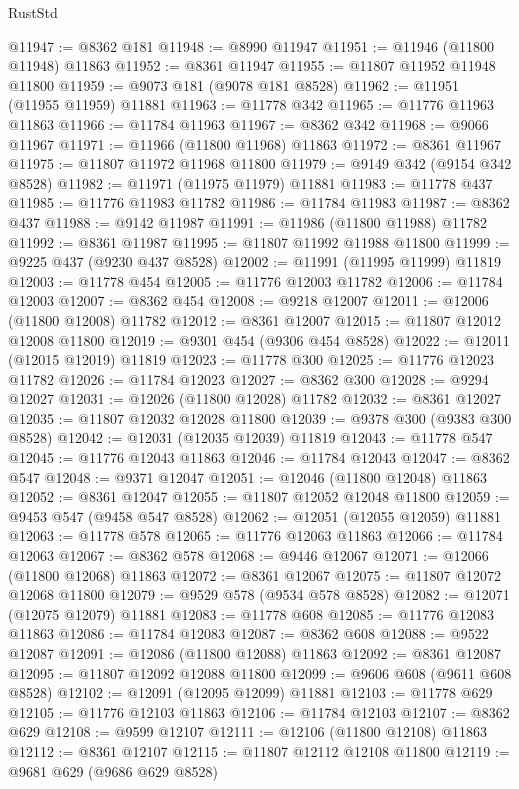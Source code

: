 \begin{lexlean}{RustStd}
\begin{coremodule}
@11947 := @8362 @181
@11948 := @8990 @11947
@11951 := @11946 (@11800 @11948) @11863
@11952 := @8361 @11947
@11955 := @11807 @11952 @11948 @11800
@11959 := @9073 @181 (@9078 @181 @8528)
@11962 := @11951 (@11955 @11959) @11881
@11963 := @11778 @342
@11965 := @11776 @11963 @11863
@11966 := @11784 @11963
@11967 := @8362 @342
@11968 := @9066 @11967
@11971 := @11966 (@11800 @11968) @11863
@11972 := @8361 @11967
@11975 := @11807 @11972 @11968 @11800
@11979 := @9149 @342 (@9154 @342 @8528)
@11982 := @11971 (@11975 @11979) @11881
@11983 := @11778 @437
@11985 := @11776 @11983 @11782
@11986 := @11784 @11983
@11987 := @8362 @437
@11988 := @9142 @11987
@11991 := @11986 (@11800 @11988) @11782
@11992 := @8361 @11987
@11995 := @11807 @11992 @11988 @11800
@11999 := @9225 @437 (@9230 @437 @8528)
@12002 := @11991 (@11995 @11999) @11819
@12003 := @11778 @454
@12005 := @11776 @12003 @11782
@12006 := @11784 @12003
@12007 := @8362 @454
@12008 := @9218 @12007
@12011 := @12006 (@11800 @12008) @11782
@12012 := @8361 @12007
@12015 := @11807 @12012 @12008 @11800
@12019 := @9301 @454 (@9306 @454 @8528)
@12022 := @12011 (@12015 @12019) @11819
@12023 := @11778 @300
@12025 := @11776 @12023 @11782
@12026 := @11784 @12023
@12027 := @8362 @300
@12028 := @9294 @12027
@12031 := @12026 (@11800 @12028) @11782
@12032 := @8361 @12027
@12035 := @11807 @12032 @12028 @11800
@12039 := @9378 @300 (@9383 @300 @8528)
@12042 := @12031 (@12035 @12039) @11819
@12043 := @11778 @547
@12045 := @11776 @12043 @11863
@12046 := @11784 @12043
@12047 := @8362 @547
@12048 := @9371 @12047
@12051 := @12046 (@11800 @12048) @11863
@12052 := @8361 @12047
@12055 := @11807 @12052 @12048 @11800
@12059 := @9453 @547 (@9458 @547 @8528)
@12062 := @12051 (@12055 @12059) @11881
@12063 := @11778 @578
@12065 := @11776 @12063 @11863
@12066 := @11784 @12063
@12067 := @8362 @578
@12068 := @9446 @12067
@12071 := @12066 (@11800 @12068) @11863
@12072 := @8361 @12067
@12075 := @11807 @12072 @12068 @11800
@12079 := @9529 @578 (@9534 @578 @8528)
@12082 := @12071 (@12075 @12079) @11881
@12083 := @11778 @608
@12085 := @11776 @12083 @11863
@12086 := @11784 @12083
@12087 := @8362 @608
@12088 := @9522 @12087
@12091 := @12086 (@11800 @12088) @11863
@12092 := @8361 @12087
@12095 := @11807 @12092 @12088 @11800
@12099 := @9606 @608 (@9611 @608 @8528)
@12102 := @12091 (@12095 @12099) @11881
@12103 := @11778 @629
@12105 := @11776 @12103 @11863
@12106 := @11784 @12103
@12107 := @8362 @629
@12108 := @9599 @12107
@12111 := @12106 (@11800 @12108) @11863
@12112 := @8361 @12107
@12115 := @11807 @12112 @12108 @11800
@12119 := @9681 @629 (@9686 @629 @8528)

\end{coremodule}
\end{lexlean}
